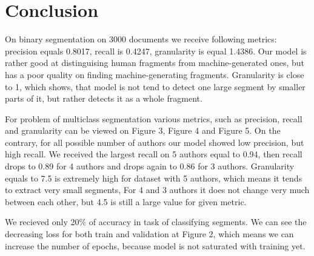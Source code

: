 \documentclass{article}
\begin{document}




  
\section{Conclusion}

On binary segmentation on 3000 documents we receive following metrics: precision equals 0.8017, recall is 0.4247, granularity is equal 1.4386. Our model is rather good at distinguising human fragments from machine-generated ones, but has a poor quality on finding machine-generating fragments. Granularity is close to 1, which shows, that model is not tend to detect one large segment by smaller parts of it, but rather detects it as a whole fragment. 

For problem of multiclass segmentation various metrics, such as precision, recall and granularity can be viewed on Figure 3, Figure 4 and Figure 5.  On the contrary, for all possible number of authors our model showed low precision, but high recall. We received the largest recall on 5 authors equal to 0.94, then recall drops to 0.89 for 4 authors and drops again to 0.86 for 3 authors. Granularity equals to 7.5 is extremely high for dataset with 5 authors, which means it tends to extract very small segments, For 4 and 3 authors it does not change very much between each other, but 4.5 is still a large value for given metric.

We recieved only 20$\%$ of accuracy in task of classifying segments. We can see the decreasing loss for both train and validation at Figure 2, which means we can increase the number of epochs, because model is not saturated with training yet. 
\end{document}
